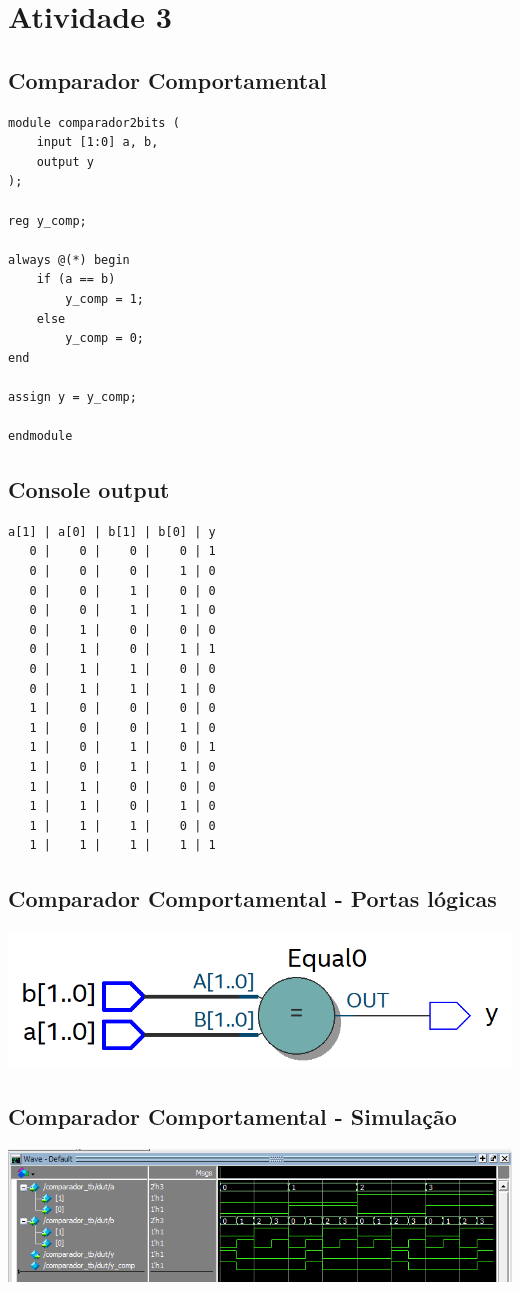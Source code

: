 \documentclass{article}
\begin{document}
\newpage

\section*{Atividade 3}
\setcounter{section}{3}
\setcounter{subsection}{0}

\subsection{Comparador Comportamental}
\begin{verbatim}
module comparador2bits (
    input [1:0] a, b,
    output y
);

reg y_comp;

always @(*) begin
    if (a == b)
        y_comp = 1;
    else
        y_comp = 0;
end

assign y = y_comp;

endmodule
\end{verbatim}

\subsection{Console output}
\begin{verbatim}
a[1] | a[0] | b[1] | b[0] | y
   0 |    0 |    0 |    0 | 1
   0 |    0 |    0 |    1 | 0
   0 |    0 |    1 |    0 | 0
   0 |    0 |    1 |    1 | 0
   0 |    1 |    0 |    0 | 0
   0 |    1 |    0 |    1 | 1
   0 |    1 |    1 |    0 | 0
   0 |    1 |    1 |    1 | 0
   1 |    0 |    0 |    0 | 0
   1 |    0 |    0 |    1 | 0
   1 |    0 |    1 |    0 | 1
   1 |    0 |    1 |    1 | 0
   1 |    1 |    0 |    0 | 0
   1 |    1 |    0 |    1 | 0
   1 |    1 |    1 |    0 | 0
   1 |    1 |    1 |    1 | 1
\end{verbatim}

\subsection{Comparador Comportamental - Portas lógicas}
\includegraphics[width=1\textwidth]{comportamental_rtl.png}

\subsection{Comparador Comportamental - Simulação}
\includegraphics[width=1\textwidth]{comportamental_wave.png}
\end{document}
